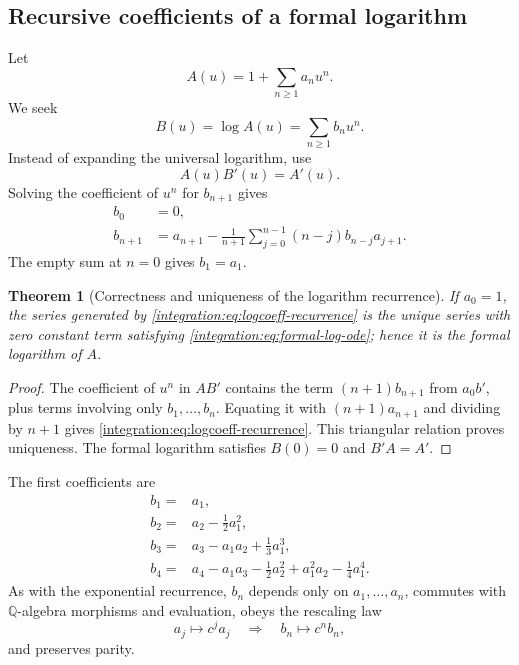 \documentclass[11pt,oneside]{article}
\newtheorem{theorem}{Theorem}[section]
\theoremstyle{definition}
\theoremstyle{remark}
\newcommand{\Q}{\mathbb Q}
\begin{document}
\subsection{Recursive coefficients of a formal logarithm}
\label{integration:sec:log-coeff}

Let
\begin{equation}
 A(u)=1+\sum_{n\ge1}a_nu^n.
 \label{integration:eq:unit-mass-series}
\end{equation}
We seek
\begin{equation}
 B(u)=\log A(u)=\sum_{n\ge1}b_nu^n.
 \label{integration:eq:formal-log-series}
\end{equation}
Instead of expanding the universal logarithm, use
\begin{equation}
 A(u)B'(u)=A'(u).
 \label{integration:eq:formal-log-ode}
\end{equation}
Solving the coefficient of $u^n$ for $b_{n+1}$ gives
\begin{align}
 b_0&=0,                                                     \label{integration:eq:logcoeff-zero}\\
 b_{n+1}&=a_{n+1}-\frac1{n+1}
 \sum_{j=0}^{n-1}(n-j)b_{n-j}a_{j+1}.                      \label{integration:eq:logcoeff-recurrence}
\end{align}
The empty sum at $n=0$ gives $b_1=a_1$.

\begin{theorem}[Correctness and uniqueness of the logarithm recurrence]
\label{integration:thm:logcoeff-correctness}
If $a_0=1$, the series generated by \eqref{integration:eq:logcoeff-recurrence} is the unique series with
zero constant term satisfying \eqref{integration:eq:formal-log-ode}; hence it is the formal logarithm of
$A$.
\end{theorem}

\begin{proof}
The coefficient of $u^n$ in $AB'$ contains the term $(n+1)b_{n+1}$ from $a_0b'$, plus terms
involving only $b_1,\ldots,b_n$.  Equating it with $(n+1)a_{n+1}$ and dividing by $n+1$
gives \eqref{integration:eq:logcoeff-recurrence}.  This triangular relation proves uniqueness.  The
formal logarithm satisfies $B(0)=0$ and $B'A=A'$.
\end{proof}

The first coefficients are
\begin{align}
 b_1={}&a_1,                                                  \label{integration:eq:b1}\\
 b_2={}&a_2-\frac12a_1^2,                                   \label{integration:eq:b2}\\
 b_3={}&a_3-a_1a_2+\frac13a_1^3,                            \label{integration:eq:b3}\\
 b_4={}&a_4-a_1a_3-\frac12a_2^2+a_1^2a_2-\frac14a_1^4.     \label{integration:eq:b4}
\end{align}
As with the exponential recurrence, $b_n$ depends only on $a_1,\ldots,a_n$, commutes with
$\Q$-algebra morphisms and evaluation, obeys the rescaling law
\begin{equation}
 a_j\mapsto c^ja_j\quad\Longrightarrow\quad b_n\mapsto c^nb_n,
 \label{integration:eq:logcoeff-rescale}
\end{equation}
and preserves parity.
\end{document}
